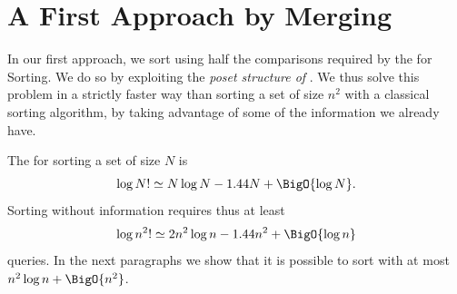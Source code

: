 \section{A First Approach by Merging}
\label{tree:xy:merge}

In our first approach, we sort \XY using half
the comparisons required by the \ITLB for Sorting. We do so by exploiting the
\emph{poset structure of \XY}.
We thus solve this problem in a strictly faster way than sorting a set of size
\(n^2\)
with a classical sorting algorithm, by taking advantage of some of the information we already have.

The \ITLB for sorting a set of size \(N\) is
\begin{displaymath}
\log N! \simeq N \log N - 1.44 N + \BigO{\log N}.
\end{displaymath}
Sorting \XY without information requires thus at least
\begin{displaymath}
\log n^2! \simeq 2 n^2 \log n - 1.44 n^2 + \BigO{\log n}
\end{displaymath}
queries.
In the next paragraphs we show that it is possible to sort \XY
with at most \(n^2 \log n + \BigO{n^2}\).

